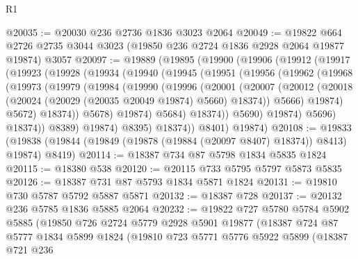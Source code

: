 \begin{lexlean}{R1}
\begin{coremodule}
@20035 := @20030 @236 @2736 @1836 @3023 @2064
@20049 := @19822
    @664
    @2726
    @2735
    @3044
    @3023
    (@19850 @236 @2724 @1836 @2928 @2064 @19877 @19874)
    @3057
@20097 := @19889
    (@19895
      (@19900
        (@19906
          (@19912
            (@19917
              (@19923
                (@19928
                  (@19934
                    (@19940
                      (@19945
                        (@19951
                          (@19956
                            (@19962
                              (@19968
                                (@19973
                                  (@19979
                                    (@19984
                                      (@19990
                                        (@19996
                                          (@20001
                                            (@20007
                                              (@20012
                                                (@20018
                                                  (@20024
                                                    (@20029 (@20035 @20049 @19874) @5660)
                                                    @18374))
                                                @5666)
                                              @19874)
                                            @5672)
                                          @18374))
                                      @5678)
                                    @19874)
                                  @5684)
                                @18374))
                            @5690)
                          @19874)
                        @5696)
                      @18374))
                  @8389)
                @19874)
              @8395)
            @18374))
        @8401)
      @19874)
@20108 := @19833
    (@19838 (@19844 (@19849 (@19878 (@19884 (@20097 @8407) @18374)) @8413) @19874) @8419)
@20114 := @18387 @734 @87 @5798 @1834 @5835 @1824
@20115 := @18380 @538
@20120 := @20115 @733 @5795 @5797 @5873 @5835
@20126 := @18387 @731 @87 @5793 @1834 @5871 @1824
@20131 := @19810 @730 @5787 @5792 @5887 @5871
@20132 := @18387 @728
@20137 := @20132 @236 @5785 @1836 @5885 @2064
@20232 := @19822
    @727
    @5780
    @5784
    @5902
    @5885
    (@19850
      @726
      @2724
      @5779
      @2928
      @5901
      @19877
      (@18387
        @724
        @87
        @5777
        @1834
        @5899
        @1824
        (@19810
          @723
          @5771
          @5776
          @5922
          @5899
          (@18387
            @721
            @236

\end{coremodule}
\end{lexlean}
